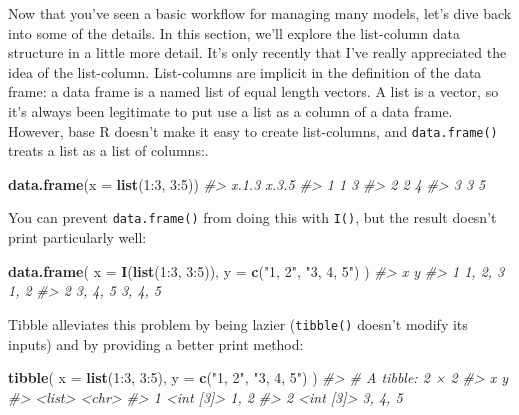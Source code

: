 \documentclass[]{book}
\newenvironment{Shaded}{\begin{snugshade}}{\end{snugshade}}
\newcommand{\KeywordTok}[1]{\textcolor[rgb]{0.13,0.29,0.53}{\textbf{{#1}}}}
\newcommand{\DataTypeTok}[1]{\textcolor[rgb]{0.13,0.29,0.53}{{#1}}}
\newcommand{\DecValTok}[1]{\textcolor[rgb]{0.00,0.00,0.81}{{#1}}}
\newcommand{\StringTok}[1]{\textcolor[rgb]{0.31,0.60,0.02}{{#1}}}
\newcommand{\CommentTok}[1]{\textcolor[rgb]{0.56,0.35,0.01}{\textit{{#1}}}}
\newcommand{\NormalTok}[1]{{#1}}
\begin{document}
Now that you've seen a basic workflow for managing many models, let's
dive back into some of the details. In this section, we'll explore the
list-column data structure in a little more detail. It's only recently
that I've really appreciated the idea of the list-column. List-columns
are implicit in the definition of the data frame: a data frame is a
named list of equal length vectors. A list is a vector, so it's always
been legitimate to put use a list as a column of a data frame. However,
base R doesn't make it easy to create list-columns, and
\texttt{data.frame()} treats a list as a list of columns:.

\begin{Shaded}
\begin{Highlighting}[]
\KeywordTok{data.frame}\NormalTok{(}\DataTypeTok{x =} \KeywordTok{list}\NormalTok{(}\DecValTok{1}\NormalTok{:}\DecValTok{3}\NormalTok{, }\DecValTok{3}\NormalTok{:}\DecValTok{5}\NormalTok{))}
\CommentTok{#>   x.1.3 x.3.5}
\CommentTok{#> 1     1     3}
\CommentTok{#> 2     2     4}
\CommentTok{#> 3     3     5}
\end{Highlighting}
\end{Shaded}

You can prevent \texttt{data.frame()} from doing this with \texttt{I()},
but the result doesn't print particularly well:

\begin{Shaded}
\begin{Highlighting}[]
\KeywordTok{data.frame}\NormalTok{(}
  \DataTypeTok{x =} \KeywordTok{I}\NormalTok{(}\KeywordTok{list}\NormalTok{(}\DecValTok{1}\NormalTok{:}\DecValTok{3}\NormalTok{, }\DecValTok{3}\NormalTok{:}\DecValTok{5}\NormalTok{)), }
  \DataTypeTok{y =} \KeywordTok{c}\NormalTok{(}\StringTok{"1, 2"}\NormalTok{, }\StringTok{"3, 4, 5"}\NormalTok{)}
\NormalTok{)}
\CommentTok{#>         x       y}
\CommentTok{#> 1 1, 2, 3    1, 2}
\CommentTok{#> 2 3, 4, 5 3, 4, 5}
\end{Highlighting}
\end{Shaded}

Tibble alleviates this problem by being lazier (\texttt{tibble()}
doesn't modify its inputs) and by providing a better print method:

\begin{Shaded}
\begin{Highlighting}[]
\KeywordTok{tibble}\NormalTok{(}
  \DataTypeTok{x =} \KeywordTok{list}\NormalTok{(}\DecValTok{1}\NormalTok{:}\DecValTok{3}\NormalTok{, }\DecValTok{3}\NormalTok{:}\DecValTok{5}\NormalTok{), }
  \DataTypeTok{y =} \KeywordTok{c}\NormalTok{(}\StringTok{"1, 2"}\NormalTok{, }\StringTok{"3, 4, 5"}\NormalTok{)}
\NormalTok{)}
\CommentTok{#> # A tibble: 2 × 2}
\CommentTok{#>           x       y}
\CommentTok{#>      <list>   <chr>}
\CommentTok{#> 1 <int [3]>    1, 2}
\CommentTok{#> 2 <int [3]> 3, 4, 5}
\end{Highlighting}
\end{Shaded}
\end{document}
